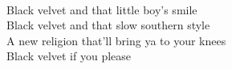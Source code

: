\\
	Black velvet and that little boy's smile \\
	Black velvet and that slow southern style \\
	A new religion that'll bring ya to your knees \\
	Black velvet if you please \\


